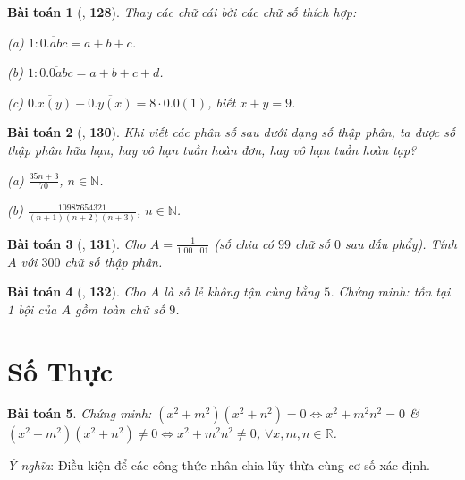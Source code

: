 \documentclass{article}
\numberwithin{equation}{section}
\newtheorem{baitoan}{Bài toán}[section]
\begin{document}
\begin{baitoan}[\cite{Binh_Toan_7_tap_1}, \textbf{128}]
	Thay các chữ cái bởi các chữ số thích hợp:
	\begin{enumerate*}
		\item[(a)] $1:\overline{0.abc} = a + b + c$.
		\item[(b)] $1:\overline{0.0abc} = a + b + c + d$.
		\item[(c)] $\overline{0.x(y)} - \overline{0.y(x)} = 8\cdot0.0(1)$, biết $x + y = 9$.
	\end{enumerate*}
\end{baitoan}

\begin{baitoan}[\cite{Binh_Toan_7_tap_1}, \textbf{130}]
	Khi viết các phân số sau dưới dạng số thập phân, ta được số thập phân hữu hạn, hay vô hạn tuần hoàn đơn, hay vô hạn tuần hoàn tạp?
	\begin{enumerate*}
		\item[(a)] $\frac{35n + 3}{70}$, $n\in\mathbb{N}$.
		\item[(b)] $\frac{10987654321}{(n + 1)(n + 2)(n + 3)}$, $n\in\mathbb{N}$.
	\end{enumerate*}
\end{baitoan}

\begin{baitoan}[\cite{Binh_Toan_7_tap_1}, \textbf{131}]
	Cho $A = \frac{1}{1.00\ldots 01}$ (số chia có $99$ chữ số $0$ sau dấu phẩy). Tính $A$ với $300$ chữ số thập phân.
\end{baitoan}

\begin{baitoan}[\cite{Binh_Toan_7_tap_1}, \textbf{132}]
	Cho $A$ là số lẻ không tận cùng bằng $5$. Chứng minh: tồn tại 1 bội của $A$ gồm toàn chữ số $9$.
\end{baitoan}


\section{Số Thực}

\begin{baitoan}
	Chứng minh: $(x^2 + m^2)(x^2 + n^2) = 0\Leftrightarrow x^2 + m^2n^2 = 0$ \& $(x^2 + m^2)(x^2 + n^2)\ne 0\Leftrightarrow x^2 + m^2n^2\ne 0$, $\forall x,m,n\in\mathbb{R}$.
\end{baitoan}
\textit{Ý nghĩa}: Điều kiện để các công thức nhân chia lũy thừa cùng cơ số xác định.
\end{document}
